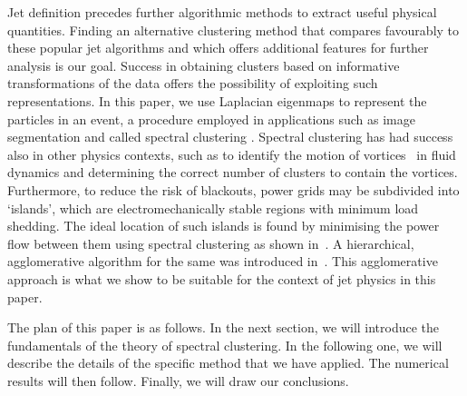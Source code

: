 Jet definition precedes further algorithmic methods to extract useful
physical quantities. Finding an alternative clustering method that compares favourably to
these popular jet algorithms and which offers additional features for further analysis is our goal.
Success in obtaining clusters based on informative transformations of the data
offers the possibility of exploiting such representations.
In this paper, we use Laplacian eigenmaps \cite{Belkin:2003_unfound4} to represent the particles
in an event, a procedure employed in applications such as image segmentation \cite{Shi:1997_unfound595}
and called spectral clustering \cite{Ng:2001_unfound543}.
Spectral clustering has had success also in other physics contexts, such as to identify the motion
of vortices~\cite{Hadjighasem:2016_unfound447} in fluid dynamics 
and determining the correct number of clusters to contain the vortices.
Furthermore, to reduce the risk of blackouts, power grids may be subdivided into `islands',
which are
electromechanically stable regions with minimum load shedding.
The ideal location of such islands is found by minimising the power flow between them using spectral clustering as shown in~\cite{HaoLi:2005_unfound114}.  A hierarchical, agglomerative algorithm for the same was introduced in~\cite{RJSanchezGarcia:2014_unfound420}.
This agglomerative approach is what we show to be suitable for the context of jet physics in this paper.

The plan of this paper is as follows. In the next section, we will introduce the fundamentals of the theory of spectral clustering. In the following one, we will describe the details of the specific method that we have applied. The numerical results will then follow. Finally, we will draw our conclusions. 
